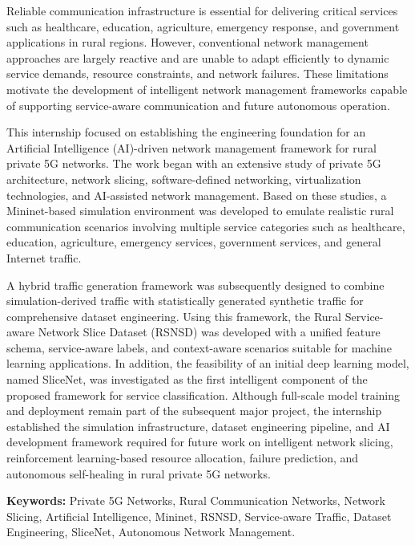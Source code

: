 \documentclass[12pt,a4paper]{report}
\begin{document}
Reliable communication infrastructure is essential for delivering critical services such as healthcare, education, agriculture, emergency response, and government applications in rural regions. However, conventional network management approaches are largely reactive and are unable to adapt efficiently to dynamic service demands, resource constraints, and network failures. These limitations motivate the development of intelligent network management frameworks capable of supporting service-aware communication and future autonomous operation.

This internship focused on establishing the engineering foundation for an Artificial Intelligence (AI)-driven network management framework for rural private 5G networks. The work began with an extensive study of private 5G architecture, network slicing, software-defined networking, virtualization technologies, and AI-assisted network management. Based on these studies, a Mininet-based simulation environment was developed to emulate realistic rural communication scenarios involving multiple service categories such as healthcare, education, agriculture, emergency services, government services, and general Internet traffic.

A hybrid traffic generation framework was subsequently designed to combine simulation-derived traffic with statistically generated synthetic traffic for comprehensive dataset engineering. Using this framework, the Rural Service-aware Network Slice Dataset (RSNSD) was developed with a unified feature schema, service-aware labels, and context-aware scenarios suitable for machine learning applications. In addition, the feasibility of an initial deep learning model, named SliceNet, was investigated as the first intelligent component of the proposed framework for service classification. Although full-scale model training and deployment remain part of the subsequent major project, the internship established the simulation infrastructure, dataset engineering pipeline, and AI development framework required for future work on intelligent network slicing, reinforcement learning-based resource allocation, failure prediction, and autonomous self-healing in rural private 5G networks.

\vspace{0.6cm}

\noindent\textbf{Keywords:}
Private 5G Networks,
Rural Communication Networks,
Network Slicing,
Artificial Intelligence,
Mininet,
RSNSD,
Service-aware Traffic,
Dataset Engineering,
SliceNet,
Autonomous Network Management.
	
\end{document}

